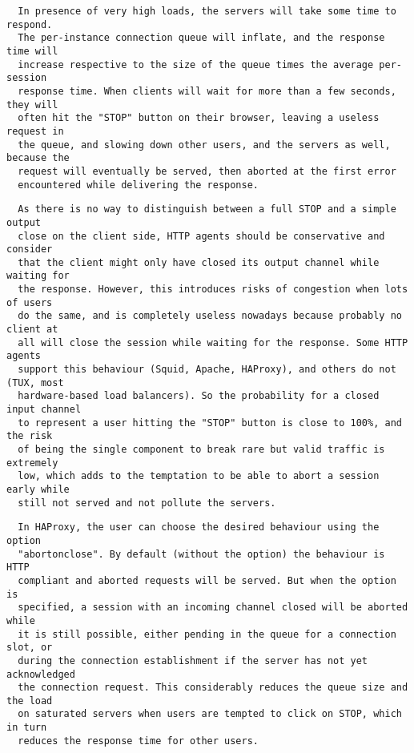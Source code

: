 \begin{verbatim}
  In presence of very high loads, the servers will take some time to respond.
  The per-instance connection queue will inflate, and the response time will
  increase respective to the size of the queue times the average per-session
  response time. When clients will wait for more than a few seconds, they will
  often hit the "STOP" button on their browser, leaving a useless request in
  the queue, and slowing down other users, and the servers as well, because the
  request will eventually be served, then aborted at the first error
  encountered while delivering the response.
\end{verbatim}

\begin{verbatim}
  As there is no way to distinguish between a full STOP and a simple output
  close on the client side, HTTP agents should be conservative and consider
  that the client might only have closed its output channel while waiting for
  the response. However, this introduces risks of congestion when lots of users
  do the same, and is completely useless nowadays because probably no client at
  all will close the session while waiting for the response. Some HTTP agents
  support this behaviour (Squid, Apache, HAProxy), and others do not (TUX, most
  hardware-based load balancers). So the probability for a closed input channel
  to represent a user hitting the "STOP" button is close to 100%, and the risk
  of being the single component to break rare but valid traffic is extremely
  low, which adds to the temptation to be able to abort a session early while
  still not served and not pollute the servers.
\end{verbatim}

\begin{verbatim}
  In HAProxy, the user can choose the desired behaviour using the option
  "abortonclose". By default (without the option) the behaviour is HTTP
  compliant and aborted requests will be served. But when the option is
  specified, a session with an incoming channel closed will be aborted while
  it is still possible, either pending in the queue for a connection slot, or
  during the connection establishment if the server has not yet acknowledged
  the connection request. This considerably reduces the queue size and the load
  on saturated servers when users are tempted to click on STOP, which in turn
  reduces the response time for other users.
\end{verbatim}

